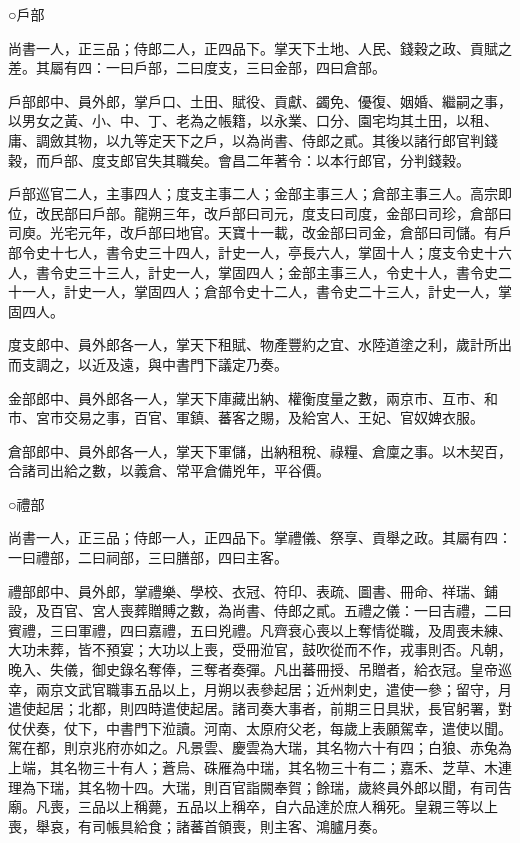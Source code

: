 \begin{pinyinscope}
 ○戶部



 尚書一人，正三品；侍郎二人，正四品下。掌天下土地、人民、錢穀之政、貢賦之差。其屬有四：一曰戶部，二曰度支，三曰金部，四曰倉部。



 戶部郎中、員外郎，掌戶口、土田、賦役、貢獻、蠲免、優復、姻婚、繼嗣之事，以男女之黃、小、中、丁、老為之帳籍，以永業、口分、園宅均其土田，以租、庸、調斂其物，以九等定天下之戶，以為尚書、侍郎之貳。其後以諸行郎官判錢穀，而戶部、度支郎官失其職矣。會昌二年著令：以本行郎官，分判錢穀。



 戶部巡官二人，主事四人；度支主事二人；金部主事三人；倉部主事三人。高宗即位，改民部曰戶部。龍朔三年，改戶部曰司元，度支曰司度，金部曰司珍，倉部曰司庾。光宅元年，改戶部曰地官。天寶十一載，改金部曰司金，倉部曰司儲。有戶部令史十七人，書令史三十四人，計史一人，亭長六人，掌固十人；度支令史十六人，書令史三十三人，計史一人，掌固四人；金部主事三人，令史十人，書令史二十一人，計史一人，掌固四人；倉部令史十二人，書令史二十三人，計史一人，掌固四人。



 度支郎中、員外郎各一人，掌天下租賦、物產豐約之宜、水陸道塗之利，歲計所出而支調之，以近及遠，與中書門下議定乃奏。



 金部郎中、員外郎各一人，掌天下庫藏出納、權衡度量之數，兩京市、互市、和市、宮市交易之事，百官、軍鎮、蕃客之賜，及給宮人、王妃、官奴婢衣服。



 倉部郎中、員外郎各一人，掌天下軍儲，出納租稅、祿糧、倉廩之事。以木契百，合諸司出給之數，以義倉、常平倉備兇年，平谷價。



 ○禮部



 尚書一人，正三品；侍郎一人，正四品下。掌禮儀、祭享、貢舉之政。其屬有四：一曰禮部，二曰祠部，三曰膳部，四曰主客。



 禮部郎中、員外郎，掌禮樂、學校、衣冠、符印、表疏、圖書、冊命、祥瑞、鋪設，及百官、宮人喪葬贈賻之數，為尚書、侍郎之貳。五禮之儀：一曰吉禮，二曰賓禮，三曰軍禮，四曰嘉禮，五曰兇禮。凡齊衰心喪以上奪情從職，及周喪未練、大功未葬，皆不預宴；大功以上喪，受冊涖官，鼓吹從而不作，戎事則否。凡朝，晚入、失儀，御史錄名奪俸，三奪者奏彈。凡出蕃冊授、吊贈者，給衣冠。皇帝巡幸，兩京文武官職事五品以上，月朔以表參起居；近州刺史，遣使一參；留守，月遣使起居；北都，則四時遣使起居。諸司奏大事者，前期三日具狀，長官躬署，對仗伏奏，仗下，中書門下涖讀。河南、太原府父老，每歲上表願駕幸，遣使以聞。駕在都，則京兆府亦如之。凡景雲、慶雲為大瑞，其名物六十有四；白狼、赤兔為上端，其名物三十有人；蒼烏、硃雁為中瑞，其名物三十有二；嘉禾、芝草、木連理為下瑞，其名物十四。大瑞，則百官詣闕奉賀；餘瑞，歲終員外郎以聞，有司告廟。凡喪，三品以上稱薨，五品以上稱卒，自六品達於庶人稱死。皇親三等以上喪，舉哀，有司帳具給食；諸蕃首領喪，則主客、鴻臚月奏。




\end{pinyinscope}
